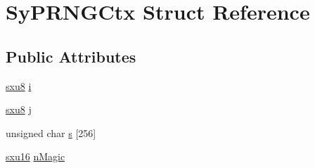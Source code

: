\hypertarget{struct_sy_p_r_n_g_ctx}{\section{Sy\-P\-R\-N\-G\-Ctx Struct Reference}
\label{d4/d7f/struct_sy_p_r_n_g_ctx}
}
\subsection*{Public Attributes}
\begin{DoxyCompactItemize}
\item 
\hyperlink{unqlite_8c_ad603950fcd99613e8ef4887422cde7a0}{sxu8} \hyperlink{struct_sy_p_r_n_g_ctx_a7cb438b2726fecdfd6995d0d050966e1}{i}
\item 
\hyperlink{unqlite_8c_ad603950fcd99613e8ef4887422cde7a0}{sxu8} \hyperlink{struct_sy_p_r_n_g_ctx_a82ac725ac4be359c01b79b24d2533fa2}{j}
\item 
unsigned char \hyperlink{struct_sy_p_r_n_g_ctx_a659fafe4c00e41ec6c1f428c9029c51c}{s} \mbox{[}256\mbox{]}
\item 
\hyperlink{unqlite_8c_a0fea45724d256332e7ae0104f83260a7}{sxu16} \hyperlink{struct_sy_p_r_n_g_ctx_a93185a416dff8ec45f934f807508e3ee}{n\-Magic}
\end{DoxyCompactItemize}


